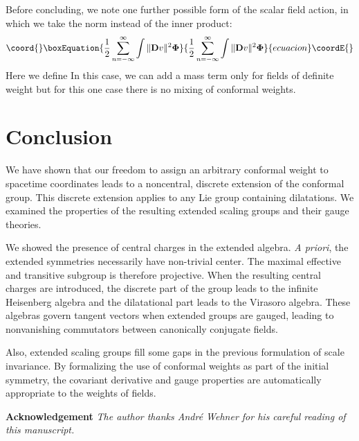\documentclass[a4paper,12pt]{article}
\begin{document}
Before concluding, we note one further possible form of the scalar field
action, in which we take the norm instead of the inner product: 
\begin{equation}\coord{}\boxEquation{
\frac{1}{2}\sum_{n=-\infty }^{\infty }\int \Vert \mathbf{D}v\Vert ^{2}
\mathbf{\Phi }
}{
\frac{1}{2}\sum_{n=-\infty }^{\infty }\int \Vert \mathbf{D}v\Vert ^{2}
\mathbf{\Phi }
}{ecuacion}\coordE{}\end{equation}
Here we define \coordHE{} In this case, we can add a mass term \coordHE{} only for fields \coordHE{} of definite weight \coordHE{}
but for this one case there is no mixing of conformal weights.

\section{Conclusion}

We have shown that our freedom to assign an arbitrary conformal weight to
spacetime coordinates leads to a noncentral, discrete extension of the
conformal group. This discrete extension applies to any Lie group
containing dilatations. We examined the properties of the resulting extended
scaling groups and their gauge theories.

We showed the presence of central charges in the extended algebra. \textit{A
priori}, the extended symmetries necessarily have non-trivial center. The
maximal effective and transitive subgroup is therefore projective. When the
resulting central charges are introduced, the discrete part of the group
leads to the infinite Heisenberg algebra and the dilatational part leads to
the Virasoro algebra. These algebras govern tangent vectors when extended
groups are gauged, leading to nonvanishing commutators between canonically
conjugate fields.

Also, extended scaling groups fill some gaps in the previous formulation of
scale invariance. By formalizing the use of conformal weights as part of the
initial symmetry, the covariant derivative and gauge properties are
automatically appropriate to the weights of fields.

\bigskip

\noindent \textbf{Acknowledgement} \textit{The author thanks Andr\'{e} Wehner for his careful reading of this manuscript.}
\end{document}
